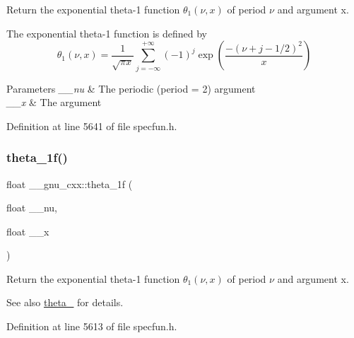 Return the exponential theta-\/1 function $ \theta_1(\nu,x) $ of period $ \nu $ and argument {\ttfamily x}.

The exponential theta-\/1 function is defined by \[ \theta_1(\nu,x) = \frac{1}{\sqrt{\pi x}} \sum_{j=-\infty}^{+\infty} (-1)^j \exp\left( \frac{-(\nu + j - 1/2)^2}{x} \right) \]


\begin{DoxyParams}{Parameters}
{\em \+\_\+\+\_\+nu} & The periodic (period = 2) argument \\
\hline
{\em \+\_\+\+\_\+x} & The argument \\
\hline
\end{DoxyParams}


Definition at line 5641 of file specfun.\+h.

\mbox{\label{group__mathsf__gnu_ga5bbf256b875da28132f9049f5984cb14}} 
\subsubsection{\texorpdfstring{theta\+\_\+1f()}{theta\_1f()}}
{\footnotesize\ttfamily float \+\_\+\+\_\+gnu\+\_\+cxx\+::theta\+\_\+1f (\begin{DoxyParamCaption}\item[{float}]{\+\_\+\+\_\+nu,  }\item[{float}]{\+\_\+\+\_\+x }\end{DoxyParamCaption})\hspace{0.3cm}{\ttfamily [inline]}}

Return the exponential theta-\/1 function $ \theta_1(\nu,x) $ of period $ \nu $ and argument {\ttfamily x}.

\begin{DoxySeeAlso}{See also}
\hyperlink{group__mathsf__gnu_gaa2e5a3a5f550fe032a596a8b01c878c0}{theta\+\_} for details. 
\end{DoxySeeAlso}


Definition at line 5613 of file specfun.\+h.

\mbox{\label{group__mathsf__gnu_ga3520684c78771ffa57180060c8b6d1ca}} 
